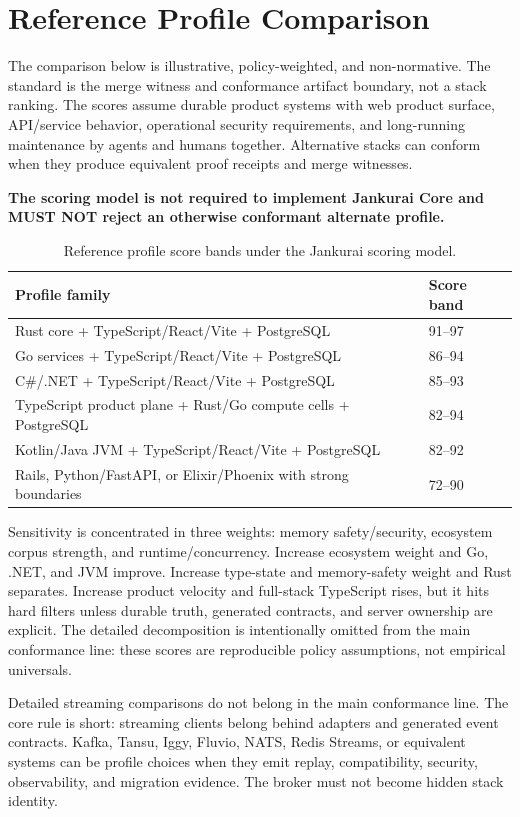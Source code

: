 \section{Reference Profile Comparison}

The comparison below is illustrative, policy-weighted, and non-normative. The standard is the merge witness and conformance artifact boundary, not a stack ranking. The scores assume durable product systems with web product surface, API/service behavior, operational security requirements, and long-running maintenance by agents and humans together. Alternative stacks can conform when they produce equivalent proof receipts and merge witnesses.

\textbf{The scoring model is not required to implement Jankurai Core and MUST NOT reject an otherwise conformant alternate profile.}

\begin{table}[t]
\caption{Reference profile score bands under the Jankurai scoring model.}
\label{tab:stack-ranking}
\centering
\small
\begin{tabularx}{\columnwidth}{Y L{0.18\columnwidth}}
\toprule
\textbf{Profile family} & \textbf{Score band} \\
\midrule
Rust core + TypeScript/React/Vite + PostgreSQL & 91--97 \\
Go services + TypeScript/React/Vite + PostgreSQL & 86--94 \\
C\#/.NET + TypeScript/React/Vite + PostgreSQL & 85--93 \\
TypeScript product plane + Rust/Go compute cells + PostgreSQL & 82--94 \\
Kotlin/Java JVM + TypeScript/React/Vite + PostgreSQL & 82--92 \\
Rails, Python/FastAPI, or Elixir/Phoenix with strong boundaries & 72--90 \\
\bottomrule
\end{tabularx}
\end{table}

Sensitivity is concentrated in three weights: memory safety/security, ecosystem corpus strength, and runtime/concurrency. Increase ecosystem weight and Go, .NET, and JVM improve. Increase type-state and memory-safety weight and Rust separates. Increase product velocity and full-stack TypeScript rises, but it hits hard filters unless durable truth, generated contracts, and server ownership are explicit. The detailed decomposition is intentionally omitted from the main conformance line: these scores are reproducible policy assumptions, not empirical universals.

Detailed streaming comparisons do not belong in the main conformance line. The core rule is short: streaming clients belong behind adapters and generated event contracts. Kafka, Tansu, Iggy, Fluvio, NATS, Redis Streams, or equivalent systems can be profile choices when they emit replay, compatibility, security, observability, and migration evidence. The broker must not become hidden stack identity.

